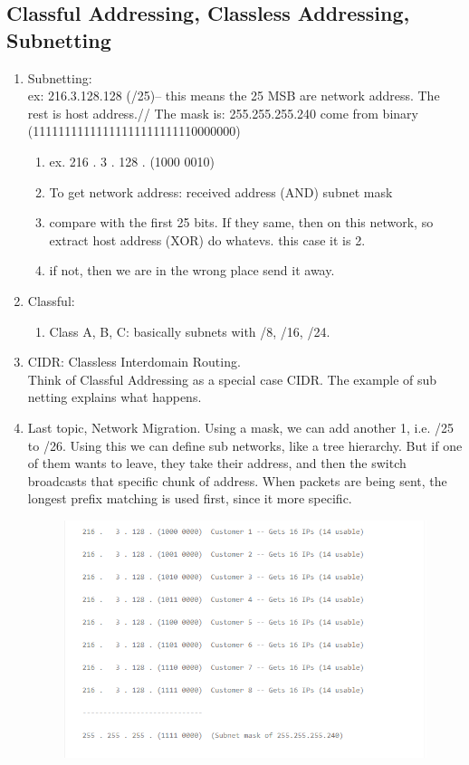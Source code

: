 \documentclass[12pt]{book}
\begin{document}
\subsection{Classful Addressing, Classless Addressing, Subnetting}
\begin{enumerate}
    \item Subnetting: \\
    ex: 216.3.128.128 (/25)-- this means the 25 MSB are network address. The rest is host address.//
    The mask is: 255.255.255.240 come from binary (11111111111111111111111110000000)
    \begin{enumerate}
        \item ex. 216 .   3 . 128 . (1000 0010)
        \item To get network address: received address (AND) subnet mask
        \item compare with the first 25 bits. If they same, then on this network, so extract host address (XOR) do whatevs. this case it is 2.
        \item if not, then we are in the wrong place send it away.
    \end{enumerate}
    \item Classful:
    \begin{enumerate}
        \item Class A, B, C: basically subnets with /8, /16, /24.
    \end{enumerate}
    \item CIDR: Classless Interdomain Routing.\\
    Think of Classful Addressing as a special case CIDR.
    The example of sub netting explains what happens.
    \item Last topic, Network Migration.
    Using a mask, we can add another 1, i.e. /25 to /26. Using this we can define sub networks, like a tree hierarchy. But if one of them wants to leave, they take their address, and then the switch broadcasts that specific chunk of address. When packets are being sent, the longest prefix matching is used first, since it more specific.
    \begin{figure}[H]
        \centering
        \includegraphics[width = \textwidth]{Pictures/Subnet.png}

\end{figure}
\end{enumerate}
\end{document}
